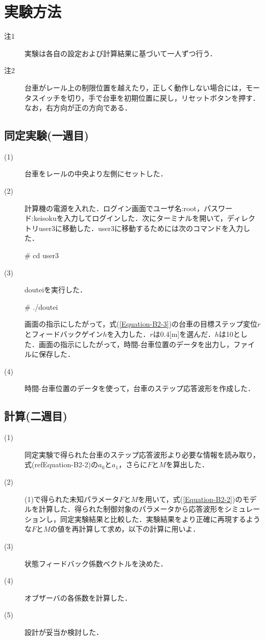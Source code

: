 \documentclass[12pt]{jsarticle}
\begin{document}
\section{実験方法}
\begin{description}
  \item[注1] 実験は各自の設定および計算結果に基づいて一人ずつ行う．
  \item[注2] 台車がレール上の制限位置を越えたり，正しく動作しない場合には，モータスイッチを切り，手で台車を初期位置に戻し，リセットボタンを押す．なお，右方向が正の方向である．
\end{description}
\subsection{同定実験(一週目)}
\begin{description}
  \item[(1)] 台車をレールの中央より左側にセットした．
　\item[(2)] 計算機の電源を入れた．ログイン画面でユーザ名:root，パスワード:keisokuを入力してログインした．次にターミナルを開いて，ディレクトリuser3に移動した．user3に移動するためには次のコマンドを入力した．
\begin{center}
  \# cd user3
\end{center}
  \item[(3)] douteiを実行した．
\begin{center}
  \# ./doutei
\end{center}
  画面の指示にしたがって，式(\ref{Equation-B2-3})の台車の目標ステップ変位$r$とフィードバックゲイン$h$を入力した．$r$は0.4[m]を選んだ．$h$は10とした．画面の指示にしたがって，時間-台車位置のデータを出力し，ファイルに保存した．
  \item[(4)] 時間-台車位置のデータを使って，台車のステップ応答波形を作成した．
\end{description}
\subsection{計算(二週目)}
\begin{description}
  \item[(1)] 同定実験で得られた台車のステップ応答波形より必要な情報を読み取り，式(ref{Equation-B2-2})の$a_0$と$a_1$，さらに$F$と$M$を算出した．
  \item[(2)] (1)で得られた未知パラメータ$F$と$M$を用いて，式(\ref{Equation-B2-2})のモデルを計算した．得られた制御対象のパラメータから応答波形をシミュレーションし，同定実験結果と比較した．実験結果をより正確に再現するような$F$と$M$の値を再計算して求め，以下の計算に用いよ．
  \item[(3)] 状態フィードバック係数ベクトルを決めた．
  \item[(4)] オブザーバの各係数を計算した．
  \item[(5)] 設計が妥当か検討した．
\end{description}
\end{document}
